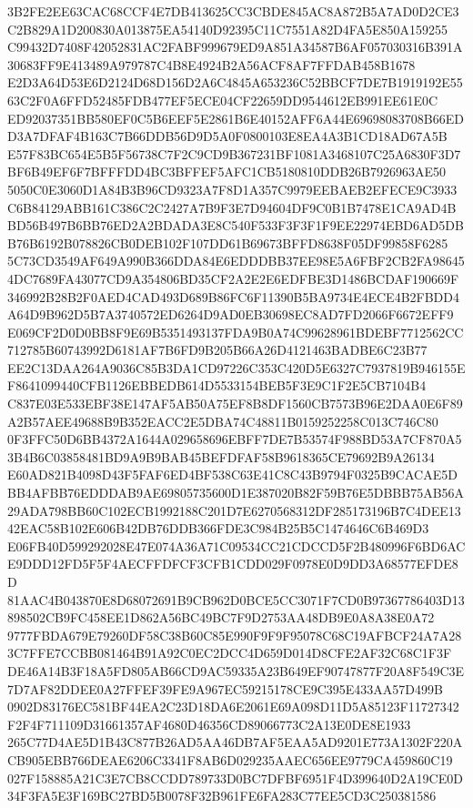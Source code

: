 \documentclass[UTF8,fontset=fandol,zihao=-4,a4paper]{ctexart}
\begin{document}
{{3B2FE2EE63CAC68CCF4E7DB413625CC3CBDE845AC8A872B5A7AD0D2CE3C2B829A1D200830A013875EA54140D92395C11C7551A82D4FA5E850A159255
C99432D7408F42052831AC2FABF999679ED9A851A34587B6AF057030316B391A30683FF9E413489A979787C4B8E4924B2A56ACF8AF7FFDAB458B1678
E2D3A64D53E6D2124D68D156D2A6C4845A653236C52BBCF7DE7B1919192E5563C2F0A6FFD52485FDB477EF5ECE04CF22659DD9544612EB991EE61E0C
ED92037351BB580EF0C5B6EEF5E2861B6E40152AFF6A44E69698083708B66EDD3A7DFAF4B163C7B66DDB56D9D5A0F0800103E8EA4A3B1CD18AD67A5B
E57F83BC654E5B5F56738C7F2C9CD9B367231BF1081A3468107C25A6830F3D7BF6B49EF6F7BFFFDD4BC3BFFEF5AFC1CB5180810DDB26B7926963AE50
5050C0E3060D1A84B3B96CD9323A7F8D1A357C9979EEBAEB2EFECE9C3933C6B84129ABB161C386C2C2427A7B9F3E7D94604DF9C0B1B7478E1CA9AD4B
BD56B497B6BB76ED2A2BDADA3E8C540F533F3F3F1F9EE22974EBD6AD5DBB76B6192B078826CB0DEB102F107DD61B69673BFFD8638F05DF99858F6285
5C73CD3549AF649A990B366DDA84E6EDDDBB37EE98E5A6FBF2CB2FA986454DC7689FA43077CD9A354806BD35CF2A2E2E6EDFBE3D1486BCDAF190669F
346992B28B2F0AED4CAD493D689B86FC6F11390B5BA9734E4ECE4B2FBDD4A64D9B962D5B7A3740572ED6264D9AD0EB30698EC8AD7FD2066F6672EFF9
E069CF2D0D0BB8F9E69B5351493137FDA9B0A74C99628961BDEBF7712562CC712785B60743992D6181AF7B6FD9B205B66A26D4121463BADBE6C23B77
EE2C13DAA264A9036C85B3DA1CD97226C353C420D5E6327C7937819B946155EF8641099440CFB1126EBBEDB614D5533154BEB5F3E9C1F2E5CB7104B4
C837E03E533EBF38E147AF5AB50A75EF8B8DF1560CB7573B96E2DAA0E6F89A2B57AEE49688B9B352EACC2E5DBA74C48811B0159252258C013C746C80
0F3FFC50D6BB4372A1644A029658696EBFF7DE7B53574F988BD53A7CF870A53B4B6C03858481BD9A9B9BAB45BEFDFAF58B9618365CE79692B9A26134
E60AD821B4098D43F5FAF6ED4BF538C63E41C8C43B9794F0325B9CACAE5DBB4AFBB76EDDDAB9AE69805735600D1E387020B82F59B76E5DBBB75AB56A
29ADA798BB60C102ECB1992188C201D7E6270568312DF285173196B7C4DEE1342EAC58B102E606B42DB76DDB366FDE3C984B25B5C1474646C6B469D3
E06FB40D599292028E47E074A36A71C09534CC21CDCCD5F2B480996F6BD6ACE9DDD12FD5F5F4AECFFDFCF3CFB1CDD029F0978E0D9DD3A68577EFDE8D
81AAC4B043870E8D68072691B9CB962D0BCE5CC3071F7CD0B97367786403D13898502CB9FC458EE1D862A56BC49BC7F9D2753AA48DB9E0A8A38E0A72
9777FBDA679E79260DF58C38B60C85E990F9F9F95078C68C19AFBCF24A7A283C7FFE7CCBB081464B91A92C0EC2DCC4D659D014D8CFE2AF32C68C1F3F
DE46A14B3F18A5FD805AB66CD9AC59335A23B649EF90747877F20A8F549C3E7D7AF82DDEE0A27FFEF39FE9A967EC59215178CE9C395E433AA57D499B
0902D83176EC581BF44EA2C23D18DA6E2061E69A098D11D5A85123F11727342F2F4F711109D31661357AF4680D46356CD89066773C2A13E0DE8E1933
265C77D4AE5D1B43C877B26AD5AA46DB7AF5EAA5AD9201E773A1302F220ACB905EBB766DEAE6206C3341F8AB6D029235AAEC656EE9779CA459860C19
027F158885A21C3E7CB8CCDD789733D0BC7DFBF6951F4D399640D2A19CE0D34F3FA5E3F169BC27BD5B0078F32B961FE6FA283C77EE5CD3C250381586
}}
\end{document}
